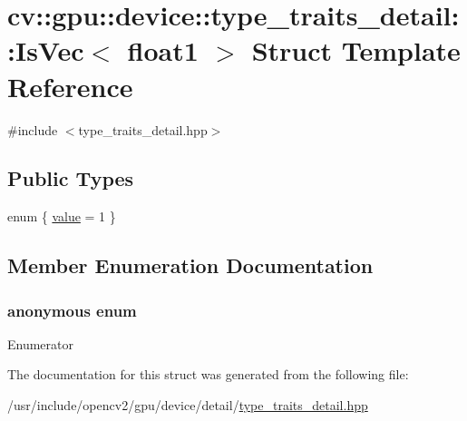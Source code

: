 \hypertarget{structcv_1_1gpu_1_1device_1_1type__traits__detail_1_1IsVec_3_01float1_01_4}{\section{cv\-:\-:gpu\-:\-:device\-:\-:type\-\_\-traits\-\_\-detail\-:\-:Is\-Vec$<$ float1 $>$ Struct Template Reference}
\label{structcv_1_1gpu_1_1device_1_1type__traits__detail_1_1IsVec_3_01float1_01_4}
}


{\ttfamily \#include $<$type\-\_\-traits\-\_\-detail.\-hpp$>$}

\subsection*{Public Types}
\begin{DoxyCompactItemize}
\item 
enum \{ \hyperlink{structcv_1_1gpu_1_1device_1_1type__traits__detail_1_1IsVec_3_01float1_01_4_abc9670b659cab6e348c8c1b020be2e4ba39ceb61f72e6395e410288c0bd3fa655}{value} = 1
 \}
\end{DoxyCompactItemize}


\subsection{Member Enumeration Documentation}
\hypertarget{structcv_1_1gpu_1_1device_1_1type__traits__detail_1_1IsVec_3_01float1_01_4_abc9670b659cab6e348c8c1b020be2e4b}{\subsubsection[{anonymous enum}]{\setlength{\rightskip}{0pt plus 5cm}anonymous enum}}\label{structcv_1_1gpu_1_1device_1_1type__traits__detail_1_1IsVec_3_01float1_01_4_abc9670b659cab6e348c8c1b020be2e4b}
\begin{Desc}
\item[Enumerator]\par
\begin{description}
\item[{\em 
\hypertarget{structcv_1_1gpu_1_1device_1_1type__traits__detail_1_1IsVec_3_01float1_01_4_abc9670b659cab6e348c8c1b020be2e4ba39ceb61f72e6395e410288c0bd3fa655}{value}\label{structcv_1_1gpu_1_1device_1_1type__traits__detail_1_1IsVec_3_01float1_01_4_abc9670b659cab6e348c8c1b020be2e4ba39ceb61f72e6395e410288c0bd3fa655}
}]\end{description}
\end{Desc}


The documentation for this struct was generated from the following file\-:\begin{DoxyCompactItemize}
\item 
/usr/include/opencv2/gpu/device/detail/\hyperlink{type__traits__detail_8hpp}{type\-\_\-traits\-\_\-detail.\-hpp}\end{DoxyCompactItemize}
